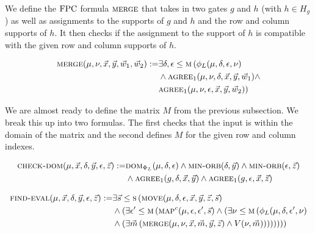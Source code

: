 \documentclass[../paper.tex]{subfiles}
\begin{document}
We define the $\text{\upshape FPC}$ formula $\textsc{merge}$ that takes in two gates $g$ and $h$
(with $h \in H_g$) as well as assignments to the supports of $g$ and $h$ and the
row and column supports of $h$. It then checks if the assignment to the support
of $h$ is compatible with the given row and column supports of $h$.
				
				
\begin{align*}
	\textsc{merge} (\mu, \nu, \vec{x}, \vec{y}, \vec{w}_1, \vec{w}_2) := & \exists \delta, \epsilon \leq \textsc{m} \, ( \phi_L (\mu, \delta, \epsilon, \nu) \\ & \land \textsc{agree}_1 (\mu, \nu , \delta, \vec{x}, \vec{y}, \vec{w}_1) \land \\ & \textsc{agree}_1 (\mu, \nu , \epsilon, \vec{x}, \vec{y}, \vec{w}_2))
\end{align*}
				
We are almost ready to define the matrix $M$ from the previous subsection. We
break this up into two formulas. The first checks that the input is within the
domain of the matrix and the second defines $M$ for the given row and column
indexes.
				
\begin{align*}
	\textsc{check-dom}(\mu, \vec{x}, \delta, \vec{y}, \epsilon, \vec{z})  := & \textsc{dom}_{\Phi_L} (\mu, \delta, \epsilon)                                                             
\land \textsc{min-orb}(\delta, \vec{y}) \land \textsc{min-orb} (\epsilon, \vec{z}) \\
& \land \textsc{agree}_1 (g, \delta , \vec{x}, \vec{y}) \land \textsc{agree}_1 (g, \epsilon , \vec{x}, \vec{z}) 
\end{align*}

\begin{align*}
	\textsc{find-eval} (\mu, \vec{x}, \delta, \vec{y}, \epsilon, \vec{z}) := & \exists \vec{s} \leq \textsc{s} \, (\textsc{move}(\mu, \delta, \epsilon, \vec{x}, \vec{y}, \vec{z}, \vec{s}) \\ & \land (\exists \epsilon' \leq \textsc{m} \, (\textsc{map}^c (\mu, \epsilon, \epsilon', \vec{s}) \land (\exists \nu \leq \textsc{m} \, (\phi_L (\mu, \delta, \epsilon', \nu) \\ & \land (\exists \vec{m} \, (\textsc{merge} (\mu, \nu, \vec{x}, \vec{m}, \vec{y}, \vec{z}) \land V(\nu, \vec{m}))))))))
\end{align*}
				
\end{document}
